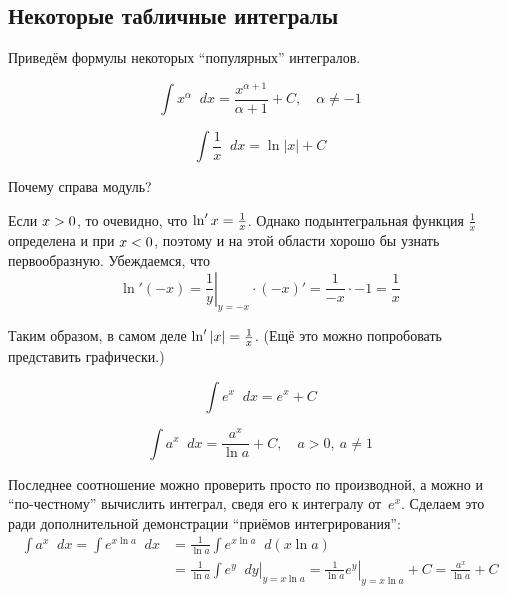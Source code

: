 \documentclass[a4paper,12pt]{article}
\newcommand{\diff}{\mathop{}\!d\!}
\begin{document}
  
  \subsection{Некоторые табличные интегралы}
  
  Приведём формулы некоторых ``популярных'' интегралов.
  
  \begin{equation}
    \int x^\alpha \diff x = \frac{x^{\alpha + 1}}{\alpha + 1} + C,\quad \alpha \not= -1
  \end{equation}
  
  \begin{equation}
    \int \frac{1}{x} \diff x = \ln |x| + C
  \end{equation}
  
  Почему справа модуль?
  
  Если $x \hm> 0$, то очевидно, что $\ln' x \hm= \frac{1}{x}$.
  Однако подынтегральная функция $\frac{1}{x}$ определена и при $x \hm< 0$, поэтому и на этой области хорошо бы узнать первообразную.
  Убеждаемся, что
  \[
    \ln'{(-x)} = \left.\frac{1}{y}\right|_{y = -x} \cdot (-x)' = \frac{1}{-x} \cdot -1 = \frac{1}{x}
  \]
  
  Таким образом, в самом деле $\ln'{|x|} \hm= \frac{1}{x}$.
  (Ещё это можно попробовать представить графически.)
  
  
  \begin{equation}
    \int e^x \diff x = e^x + C
  \end{equation}
  
  \begin{equation}
    \int a^x \diff x = \frac{a^x}{\ln a} + C,\quad a > 0,\ a \not= 1
  \end{equation}
  
  Последнее соотношение можно проверить просто по производной, а можно и ``по-честному'' вычислить интеграл, сведя его к интегралу от~$e^x$.
  Сделаем это ради дополнительной демонстрации ``приёмов интегрирования'':
  \begin{equation*}
  \begin{split}
    \int a^x \diff x = \int e^{x \ln a} \diff x &= \frac{1}{\ln a} \int e^{x \ln a} \diff (x \ln a)\\
      &= \frac{1}{\ln a} \left.\int e^{y} \diff y \right|_{y = x \ln a} = \left.\frac{1}{\ln a} e^{y}\right|_{y = x \ln a} + C
      = \frac{a^x}{\ln a} + C
  \end{split}
  \end{equation*}
  
\end{document}

